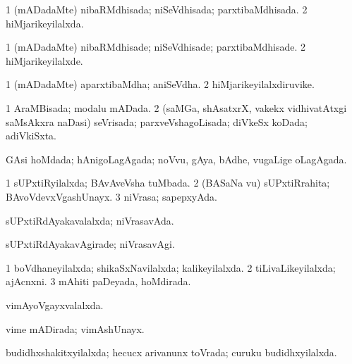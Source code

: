 \bentry
{} 
\gl{\gu}
\expl{}
\bmng
\bnum
\num{1} (mADadaMte) nibaRMdhisada; niSeVdhisada; parxtibaMdhisada. 
\num{2} hiMjarikeyilalxda. 
\enum
\emng
\eentry

\bentry
{} 
\gl{\kirxvi}
\expl{}
\bmng
\bnum
\num{1} (mADadaMte) nibaRMdhisade; niSeVdhisade; parxtibaMdhisade. 
\num{2} hiMjarikeyilalxde. 
\enum
\emng
\eentry

\bentry
{} 
\gl{\nA}
\expl{}
\bmng
\bnum
\num{1} (mADadaMte) aparxtibaMdha; aniSeVdha. 
\num{2} hiMjarikeyilalxdiruvike. 
\enum
\emng
\eentry

\bentry
{} 
\gl{\gu}
\expl{}
\bmng
\bnum
\num{1} AraMBisada; modalu mADada. 
\num{2} (saMGa, shAsatxrX, \mo vakekx vidhivatAtxgi saMsAkxra naDasi) seVrisada; parxveVshagoLisada; diVkeSx koDada; adiVkiSxta. 
\enum
\emng
\eentry

\bentry
{} 
\gl{\gu}
\expl{}
\bmng
GAsi hoMdada; hAnigoLagAgada; noVvu, gAya, bAdhe, \mo vugaLige oLagAgada. 
\emng
\eentry

\bentry
{} 
\gl{\gu}
\expl{}
\bmng
\bnum
\num{1} sUPxtiRyilalxda; BAvAveVsha tuMbada. 
\num{2} (BASaNa \mo vu) sUPxtiRrahita; BAvoVdevxVgashUnayx. 
\num{3} niVrasa; sapepxyAda. 
\enum
\emng
\eentry

\bentry
{} 
\gl{\gu}
\expl{}
\bmng
sUPxtiRdAyakavalalxda; niVrasavAda. 
\emng
\eentry

\bentry
{} 
\gl{\kirxvi}
\expl{}
\bmng
sUPxtiRdAyakavAgirade; niVrasavAgi. 
\emng
\eentry

\bentry
{} 
\gl{\gu}
\expl{}
\bmng
\bnum
\num{1} boVdhaneyilalxda; shikaSxNavilalxda; kalikeyilalxda. 
\num{2} tiLivaLikeyilalxda; ajAcnxni. 
\num{3} mAhiti paDeyada, hoMdirada. 
\enum
\emng
\eentry

\bentry
{} 
\gl{\gu}
\expl{}
\bmng
vimAyoVgayxvalalxda. 
\emng
\eentry

\bentry
{} 
\gl{\gu}
\expl{}
\bmng
vime mADirada; vimAshUnayx. 
\emng
\eentry

\bentry
{} 
\gl{\gu}
\expl{}
\bmng
budidhxshakitxyilalxda; hecucx arivanunx toVrada; curuku budidhxyilalxda. 
\emng
\eentry

